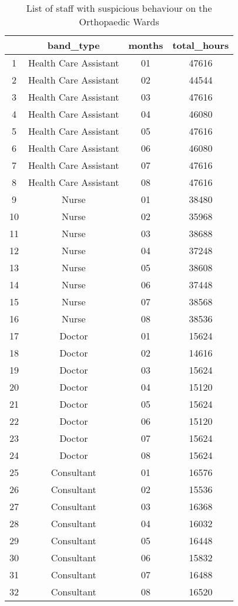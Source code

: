\documentclass{article}
\begin{document}
\begin{table}[h]
    \centering
\begin{tabular}{|c|c|c|c|}
\hline & band\_type & months & total\_hours \\
\hline 1 & Health Care Assistant & 01 & 47616 \\
\hline 2 & Health Care Assistant & 02 & 44544 \\
\hline 3 & Health Care Assistant & 03 & 47616 \\
\hline 4 & Health Care Assistant & 04 & 46080 \\
\hline 5 & Health Care Assistant & 05 & 47616 \\
\hline 6 & Health Care Assistant & 06 & 46080 \\
\hline 7 & Health Care Assistant & 07 & 47616 \\
\hline 8 & Health Care Assistant & 08 & 47616 \\
\hline 9 & Nurse & 01 & 38480 \\
\hline 10 & Nurse & 02 & 35968 \\
\hline 11 & Nurse & 03 & 38688 \\
\hline 12 & Nurse & 04 & 37248 \\
\hline 13 & Nurse & 05 & 38608 \\
\hline 14 & Nurse & 06 & 37448 \\
\hline 15 & Nurse & 07 & 38568 \\
\hline 16 & Nurse & 08 & 38536 \\
\hline 17 & Doctor & 01 & 15624 \\
\hline 18 & Doctor & 02 & 14616 \\
\hline 19 & Doctor & 03 & 15624 \\
\hline 20 & Doctor & 04 & 15120 \\
\hline 21 & Doctor & 05 & 15624 \\
\hline 22 & Doctor & 06 & 15120 \\
\hline 23 & Doctor & 07 & 15624 \\
\hline 24 & Doctor & 08 & 15624 \\
\hline 25 & Consultant & 01 & 16576 \\
\hline 26 & Consultant & 02 & 15536 \\
\hline 27 & Consultant & 03 & 16368 \\
\hline 28 & Consultant & 04 & 16032 \\
\hline 29 & Consultant & 05 & 16448 \\
\hline 30 & Consultant & 06 & 15832 \\
\hline 31 & Consultant & 07 & 16488 \\
\hline 32 & Consultant & 08 & 16520 \\
\hline
\end{tabular}
   \caption{List of staff with suspicious behaviour on the Orthopaedic Wards}
    \label{tab:task6}
\end{table}
\end{document}
